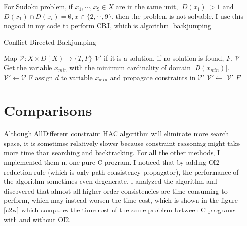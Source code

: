 \documentclass[a4paper, 12pt]{report}
\begin{document}
            For Sudoku problem, if $x_1,\cdots, x_9\in X$ are in the same unit, $|D(x_1)|>1$ and $D(x_1)\cap D(x_i)=\emptyset, x\in\{2,\cdots,9\}$, then the problem is not solvable. I use this nogood in my code to perform CBJ, which is algorithm \ref{backjumping}.

             \begin{algorithm}
                \caption{Conflict Directed Backjumping}
                \label{backjumping}
                \begin{algorithmic}[1]
                    \Require Map $\mathcal V:X\times D(X) \to \{T,F\}$
                    \Ensure $\mathcal V'$ if it is a solution, if no solution is found, $F$.
                            \State \Return $\mathcal V$
                        \EndIf
                        \State Get the variable $x_{min}$ with the minimum cardinality of domain $|D(x_{min})|$.
                            \State $\mathcal V' \gets \mathcal V$ 
                                    \State \Return F  
                                \EndIf
                            \EndFor
                            \State assign $d$ to variable $x_{min}$ and propagate constraints in $\mathcal V'$
                                \State $\mathcal V'\gets$ 
                                    \State \Return $\mathcal V'$
                                \EndIf
                            \EndIf
                        \EndFor
                        \State \Return $F$
                    \EndFunction
                \end{algorithmic}
            \end{algorithm}
    \section {Comparisons}
        Although AllDifferent constraint HAC algorithm will eliminate more search space, it is sometimes relatively slower because constraint reasoning might take more time than searching and backtracking. For all the other methods, I implemented them in one pure C program. I noticed that by adding OI2 reduction rule (which is only path consistency propagator), the performance of the algorithm sometimes even degenerate. I analyzed the algorithm and discovered that almost all higher order consistencies are
        time consuming to perform, which may instead worsen the time cost, which is shown in the figure \ref{c2w} which compares the time cost of the same problem between C programs with and without OI2.
\end{document}
